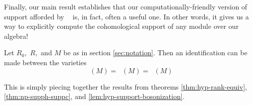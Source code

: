 \documentclass [11pt, proquest] {uwthesis}[2020/02/24]
\DeclareMathOperator{\suppc}{supp^\mathit{coh}_R}
\DeclareMathOperator{\suppr}{supp^\mathit{rnk}}
\DeclareMathOperator{\supprR}{supp^\mathit{rnk}_R}
\DeclareMathOperator{\supprRnaught}{supp^\mathit{rnk}_{R_0}}
\begin{document}
    Finally, our main result establishes that our computationally-friendly version of support afforded by $\suppr$ is, in fact, often a useful one. In other words, it gives us a way to explicitly compute the cohomological support of any module over our algebra!
    
    \begin{thm}\label{thm:support-inclusion}
        Let $R_0,$ $R,$ and $M$ be as in section \ref{sec:notation}. Then an identification can be made between the varieties
        \[\suppc(M)=\supprR(M)=\supprRnaught(M)\]
    \end{thm}
    \begin{prf}
        This is simply piecing together the results from theorems \ref{thm:hyp-rank-equiv}, \ref{thm:np-supph-suppc}, and \ref{lem:hyp-support-bosonization}.
    \end{prf}
\end{document}
